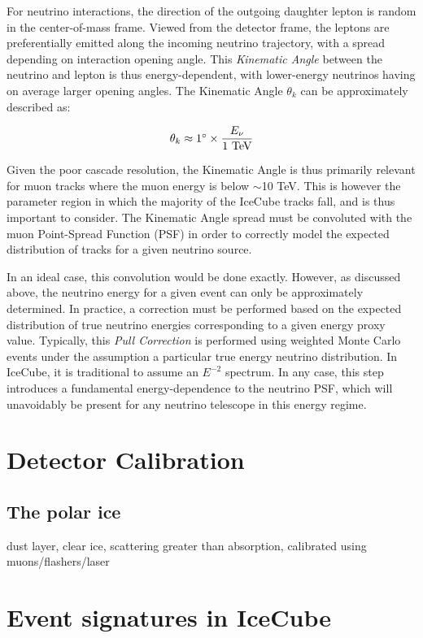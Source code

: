For neutrino interactions, the direction of the outgoing daughter lepton is random in the center-of-mass frame. Viewed from the detector frame, the leptons are preferentially emitted along the incoming neutrino trajectory, with a spread depending on interaction opening angle. This \emph{Kinematic Angle} between the neutrino and lepton is thus energy-dependent, with lower-energy neutrinos having on average larger opening angles. The Kinematic Angle $\theta_{k} $ can be approximately described as:


\begin{equation}
	\theta_{k} \approx 1 \mbox{$^\circ$} \times \frac{E_{\nu}}{\textup{1 TeV}}
\end{equation}

Given the poor cascade resolution, the Kinematic Angle is thus primarily relevant for muon tracks where the muon energy is below $\sim$10 TeV. This is however the parameter region in which the majority of the IceCube tracks fall, and is thus important to consider. The Kinematic Angle spread must be convoluted with the muon Point-Spread Function (PSF) in order to correctly model the expected distribution of tracks for a given neutrino source.

In an ideal case, this convolution would be done exactly. However, as discussed above, the neutrino energy for a given event can only be approximately determined. In practice, a correction must be performed based on the expected distribution of true neutrino energies corresponding to a given energy proxy value. Typically, this \emph{Pull Correction} is performed using weighted Monte Carlo events under the assumption a particular true energy neutrino distribution. In IceCube, it is traditional to assume an $E^{-2}$  spectrum. In any case, this step introduces a fundamental energy-dependence to the neutrino PSF, which will unavoidably be present for any neutrino telescope in this energy regime. 

\section{Detector Calibration}

\subsection{The polar ice}

dust layer, clear ice, scattering greater than absorption, calibrated using muons/flashers/laser


\section{Event signatures in IceCube}

